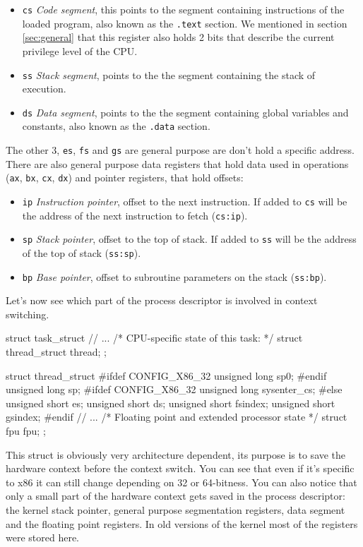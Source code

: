 \documentclass[10pt]{book}
\begin{document}
\begin{itemize}
    \item \verb|cs| \textit{Code segment}, this points to the segment containing instructions of the loaded program, also known as the \verb|.text| section. We mentioned in section \ref{sec:general} that this register also holds 2 bits that describe the current privilege level of the CPU.
    \item \verb|ss| \textit{Stack segment}, points to the the segment containing the stack of execution.
    \item \verb|ds| \textit{Data segment}, points to the the segment containing global variables and constants, also known as the \verb|.data| section.
\end{itemize}
The other 3, \verb|es|, \verb|fs| and \verb|gs| are general purpose are don't hold a specific address. There are also general purpose data registers that hold data used in operations (\verb|ax|, \verb|bx|, \verb|cx|, \verb|dx|) and pointer registers, that hold offsets:
\begin{itemize}
    \item \verb|ip| \textit{Instruction pointer}, offset to the next instruction. If added to \verb|cs| will be the address of the next instruction to fetch (\verb|cs:ip|).
    \item \verb|sp| \textit{Stack pointer}, offset to the top of stack. If added to \verb|ss| will be the address of the top of stack (\verb|ss:sp|).
    \item \verb|bp| \textit{Base pointer}, offset to subroutine parameters on the stack (\verb|ss:bp|).
\end{itemize}
Let's now see which part of the process descriptor is involved in context switching.
\begin{code}
struct task_struct {
    // ...
    /* CPU-specific state of this task: */
    struct thread_struct    thread;
};
\end{code}
\begin{code}
struct thread_struct {
#ifdef CONFIG_X86_32
    unsigned long	sp0;
#endif
    unsigned long	sp;
#ifdef CONFIG_X86_32
    unsigned long	sysenter_cs;
#else
    unsigned short	es;
    unsigned short	ds;
    unsigned short	fsindex;
    unsigned short        gsindex;
#endif
    // ...
    /* Floating point and extended processor state */
    struct fpu      fpu;
};
\end{code}
This struct is obviously very architecture dependent, its purpose is to save the hardware context before the context switch. You can see that even if it's specific to x86 it can still change depending on 32 or 64-bitness. You can also notice that only a small part of the hardware context gets saved in the process descriptor: the kernel stack pointer, general purpose segmentation registers, data segment and the floating point registers. In old versions of the kernel most of the registers were stored here.
\end{document}
